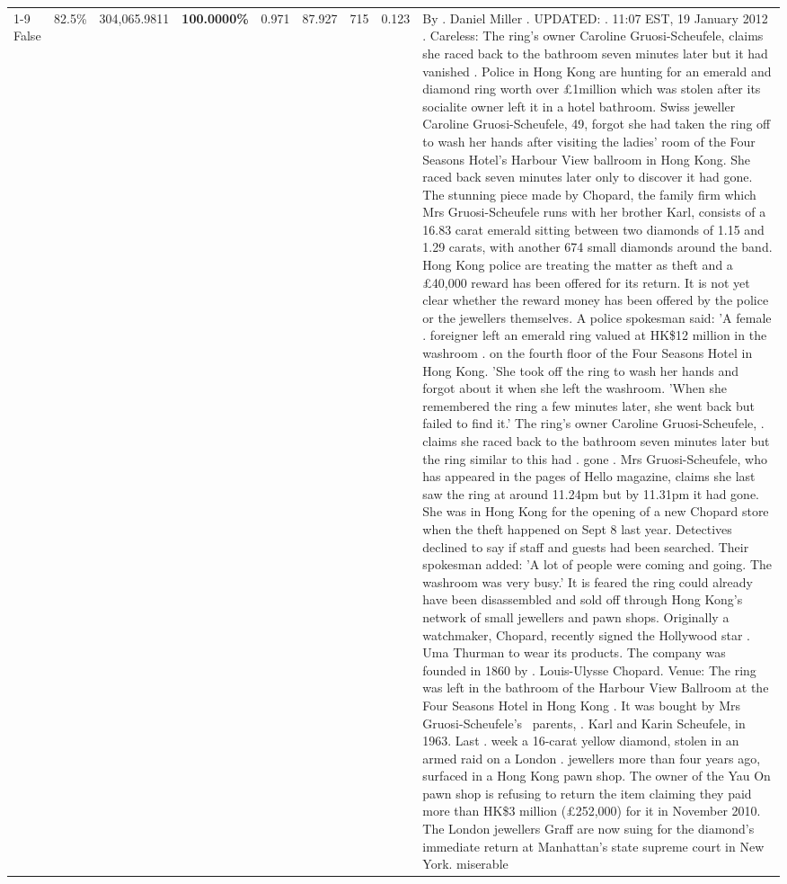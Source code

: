 \begin{table}[H]
\begin{tabular}{lllrlllll}
\cline{1-9} \cline{2-9}
False & 82.5\% & \color{red} 304,065.9811 & \bfseries \color{red} 100.0000\% & 0.971 & 87.927 & 715 & 0.123 & By . Daniel Miller . UPDATED: . 11:07 EST, 19 January 2012 . Careless: The ring's owner Caroline Gruosi-Scheufele, claims she raced back to the bathroom seven minutes later but it had vanished . Police in Hong Kong are hunting for an emerald and diamond ring worth over £1million which was stolen after its socialite owner left it in a hotel bathroom. Swiss jeweller Caroline Gruosi-Scheufele, 49, forgot she had taken the ring off to wash her hands after visiting the ladies' room of the Four Seasons Hotel's Harbour View ballroom in Hong Kong. She raced back seven minutes later only to discover it had gone. The stunning piece made by Chopard, the family firm which Mrs Gruosi-Scheufele runs with her brother Karl, consists of a 16.83 carat emerald sitting between two diamonds of 1.15 and 1.29 carats, with another 674 small diamonds around the band. Hong Kong police are treating the matter as theft and a £40,000 reward has been offered for its return. It is not yet clear whether the reward money has been offered by the police or the jewellers themselves. A police spokesman said: 'A female . foreigner left an emerald ring valued at HK\$12 million in the washroom . on the fourth floor of the Four Seasons Hotel in Hong Kong. 'She took off the ring to wash her hands and forgot about it when she left the washroom. 'When she remembered the ring a few minutes later, she went back but failed to find it.' The ring's owner Caroline Gruosi-Scheufele, . claims she raced back to the bathroom seven minutes later but the ring similar to this had . gone . Mrs Gruosi-Scheufele, who has appeared in the pages of Hello magazine, claims she last saw the ring at around 11.24pm but by 11.31pm it had gone. She was in Hong Kong for the opening of a new Chopard store when the theft happened on Sept 8 last year. Detectives declined to say if staff and guests had been searched. Their spokesman added: 'A lot of people were coming and going. The washroom was very busy.' It is feared the ring could already have been disassembled and sold off through Hong Kong's network of small jewellers and pawn shops. Originally a watchmaker, Chopard, recently signed the Hollywood star . Uma Thurman to wear its products. The company was founded in 1860 by . Louis-Ulysse Chopard. Venue: The ring was left in the bathroom of the Harbour View Ballroom at the Four Seasons Hotel in Hong Kong . It was bought by Mrs Gruosi-Scheufele's  parents, . Karl and Karin Scheufele, in 1963. Last . week a 16-carat yellow diamond, stolen in an armed raid on a London . jewellers more than four years ago, surfaced in a Hong Kong pawn shop. The owner of the Yau On pawn shop is refusing to return the item claiming they paid more than HK\$3 million (£252,000) for it in November 2010. The London jewellers Graff are now suing for the diamond’s immediate return at Manhattan’s state supreme court in New York. miserable \\

\end{tabular}
\end{table}
